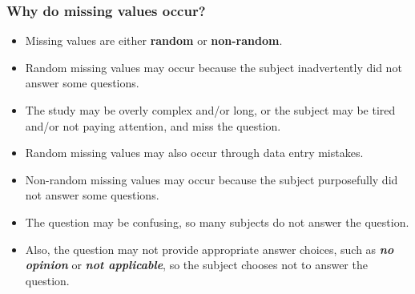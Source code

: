 \documentclass[MASTER.tex]{subfiles}
\begin{document}
\begin{frame}
\Large
\frametitle{Why do missing values occur?}
\begin{itemize}
\item		Missing values are either \textbf{random} or \textbf{non-random}.
		
\item 		Random missing values may occur because the subject inadvertently did not answer some questions. 
\item  The study may be overly complex and/or long, or the subject may be tired and/or not paying attention, and miss the question. 

\item Random missing values may also occur through data entry mistakes.
	\end{itemize}

	\end{frame}

	\begin{frame}
		\Large
	\begin{itemize}
	\item 	Non-random missing values may occur because the subject purposefully did not answer some questions.  \item  The question may be confusing, so many subjects do not answer the question. 
	\item Also, the question may not provide appropriate answer choices, such as \textbf{\textit{no opinion}} or \textit{\textbf{not applicable}}, so the subject chooses not to answer the question.
	\end{itemize}
		
	\end{frame}
\end{document}
